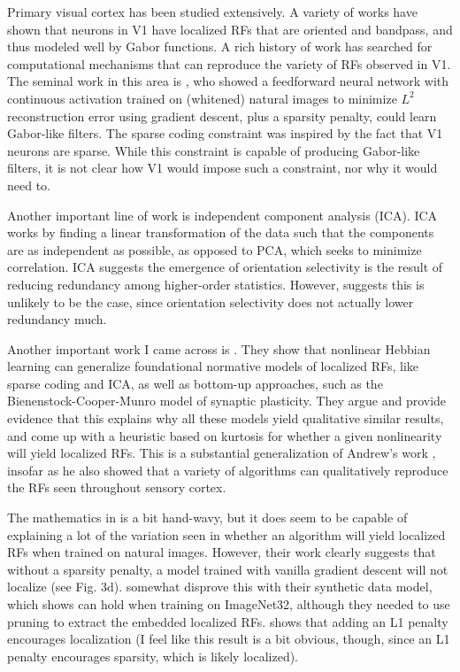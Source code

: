 Primary visual cortex has been studied extensively.
A variety of works have shown that neurons in V1 have localized RFs that are oriented and bandpass, and thus modeled well by Gabor functions.
A rich history of work has searched for computational mechanisms that can reproduce the variety of RFs observed in V1.
The seminal work in this area is \cite{olshausen1996emergence}, who showed a feedforward neural network with continuous activation trained on (whitened) natural images to minimize $L^2$ reconstruction error using gradient descent, plus a sparsity penalty, could learn Gabor-like filters.
The sparse coding constraint was inspired by the fact that V1 neurons are sparse.
While this constraint is capable of producing Gabor-like filters, it is not clear how V1 would impose such a constraint, nor why it would need to.

Another important line of work is independent component analysis (ICA).
ICA works by finding a linear transformation of the data such that the components are as independent as possible, as opposed to PCA, which seeks to minimize correlation.
ICA suggests the emergence of orientation selectivity is the result of reducing redundancy among higher-order statistics.
However, \cite{eichhorn2009natural} suggests this is unlikely to be the case, since orientation selectivity does not actually lower redundancy much.

Another important work I came across is \cite{brito2016nonlinear}.
They show that nonlinear Hebbian learning can generalize foundational normative models of localized RFs, like sparse coding and ICA, as well as bottom-up approaches, such as the Bienenstock-Cooper-Munro model of synaptic plasticity.
They argue and provide evidence that this explains why all these models yield qualitative similar results, and come up with a heuristic based on kurtosis for whether a given nonlinearity will yield localized RFs.
This is a substantial generalization of Andrew's work \cite{saxe2011modeling}, insofar as he also showed that a variety of algorithms can qualitatively reproduce the RFs seen throughout sensory cortex.

The mathematics in \cite{brito2016nonlinear} is a bit hand-wavy, but it does seem to be capable of explaining a lot of the variation seen in whether an algorithm will yield localized RFs when trained on natural images.
However, their work clearly suggests that without a sparsity penalty, a model trained with vanilla gradient descent will not localize (see Fig. 3d).
\cite{ingrosso2022data} somewhat disprove this with their synthetic data model, which \cite{pellegrini2022neural} shows can hold when training on ImageNet32, although they needed to use pruning to extract the embedded localized RFs.
\cite{redman2023sparsity} shows that adding an L1 penalty encourages localization (I feel like this result is a bit obvious, though, since an L1 penalty encourages sparsity, which is likely localized).

